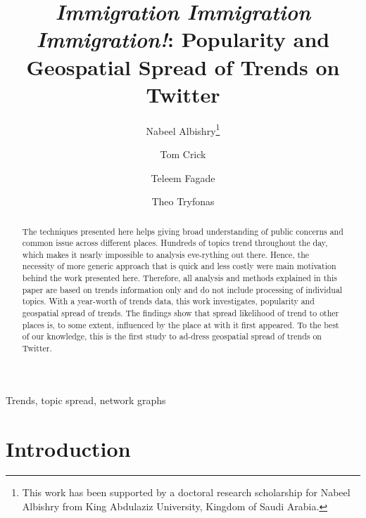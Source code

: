 \documentclass{llncs}
\begin{document}
\title{{\emph{Immigration Immigration Immigration!}}: Popularity and
  Geospatial Spread of Trends on Twitter}

\author{Nabeel Albishry\thanks{This work has been supported by a doctoral research scholarship for
Nabeel Albishry from King Abdulaziz University, Kingdom of Saudi
Arabia.} \and Tom
  Crick \and Teleem Fagade \and Theo Tryfonas}


\maketitle

\begin{abstract}
The techniques presented here helps giving broad understanding of
public concerns and common issue across different places. Hundreds of
topics trend throughout the day, which makes it nearly impossible to
analysis eve-rything out there. Hence, the necessity of more generic
approach that is quick and less costly were main motivation behind the
work presented here. Therefore, all analysis and methods explained in
this paper are based on trends information only and do not include
processing of individual topics. With a year-worth of trends data,
this work investigates, popularity and geospatial spread of
trends. The findings show that spread likelihood of trend to other
places is, to some extent, influenced by the place at with it first
appeared. To the best of our knowledge, this is the first study to
ad-dress geospatial spread of trends on Twitter.
 \end{abstract}

\begin{keywords}
Trends, topic spread, network graphs
\end{keywords}

\section{Introduction}\label{intro}
\end{document}

